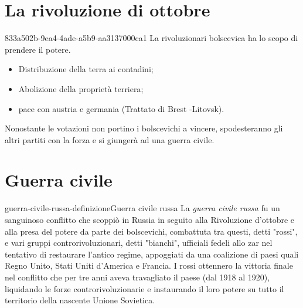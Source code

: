 \documentclass[preview]{standalone}
\begin{document}
\section{La rivoluzione di ottobre}

\begin{snippet}{833a502b-9ea4-4ade-a5b9-aa3137000ca1}
    La rivoluzionari bolscevica ha lo scopo di prendere il potere.
    \begin{itemize}
        \item Distribuzione della terra ai contadini;
        \item Abolizione della proprietà terriera;
        \item pace con austria e germania (Trattato di Brest -Litovsk).
    \end{itemize}
    
    Nonostante le votazioni non portino i bolscevichi a vincere,
    spodesteranno gli altri partiti con la forza e si giungerà ad una guerra civile.
\end{snippet}

\section{Guerra civile}

\begin{snippetdefinition}{guerra-civile-russa-definizione}{Guerra civile russa}
    La \textit{guerra civile russa} fu un sanguinoso conflitto che scoppiò in Russia in
    seguito alla Rivoluzione d'ottobre e alla presa del potere da parte dei bolscevichi,
    combattuta tra questi, detti "rossi", e vari gruppi controrivoluzionari,
    detti "bianchi", ufficiali fedeli allo zar nel tentativo di restaurare l'antico regime,
    appoggiati da una coalizione di paesi quali Regno Unito, Stati Uniti d'America e Francia.
    I rossi ottennero la vittoria finale nel conflitto che per tre anni aveva
    travagliato il paese (dal 1918 al 1920), liquidando le forze
    controrivoluzionarie e instaurando il loro potere su tutto il
    territorio della nascente Unione Sovietica.
\end{snippetdefinition}
\end{document}
